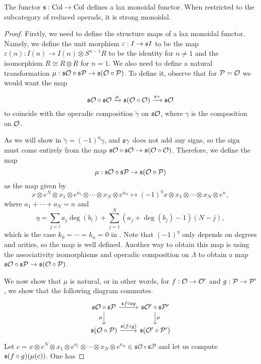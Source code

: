 \documentclass[Thesis.tex]{subfiles}
\begin{document}
\begin{propo}
The functor $\mathfrak{s}:\mathrm{Col}\to \mathrm{Col}$ defines a lax monoidal functor. When restricted to the subcategory of reduced operads, it is strong monoidal.
\end{propo}
\begin{proof}
Firstly, we need to define the structure maps of a lax monoidal functor. Namely, we define the unit morphism $\varepsilon:I\to\mathfrak{s} I$ to be the map $\varepsilon(n):I(n)\to I(n)\otimes S^{n-1}R$ to be the identity for $n\neq 1$ and the isomorphism $R\cong R\otimes R$ for $n=1$. We also need to define a natural transformation $\mu:\mathfrak{s}{\mathcal O}\circ\mathfrak{s}\mathcal{P}\to\mathfrak{s}({\mathcal O}\circ\mathcal{P})$. To define it, observe that for $\mathcal{P}={\mathcal O}$ we would want the map

\[\mathfrak{s}{\mathcal O}\circ\mathfrak{s}{\mathcal O}\xrightarrow{\mu}\mathfrak{s}({\mathcal O}\circ{\mathcal O})\xrightarrow{\mathfrak{s}\gamma}\mathfrak{s}{\mathcal O}\]
 to coincide with the operadic composition $\tilde{\gamma}$ on $\mathfrak{s}{\mathcal O}$, where $\gamma$ is the composition on ${\mathcal O}$. 
 
 As we will show in  $\tilde{\gamma}=(-1)^\eta\gamma$, and $\mathfrak{s}\gamma$ does not add any signs, so the sign must come entirely from the map $\mathfrak{s}{\mathcal O}\circ\mathfrak{s}{\mathcal O}\to\mathfrak{s}({\mathcal O}\circ{\mathcal O})$. Therefore, we define the map \[\mu:\mathfrak{s}{\mathcal O}\circ\mathfrak{s}\mathcal{P}\to\mathfrak{s}({\mathcal O}\circ\mathcal{P})\] as the map given by
 \[x\otimes e^N\otimes x_1\otimes e^{a_1}\otimes\cdots\otimes x_N\otimes e^{a_N}\mapsto (-1)^\eta x\otimes x_1\otimes\cdots\otimes x_N \otimes e^n,\]
 where $a_1+\cdots+a_N=n$ and 
 \[\eta=\sum_{j<l}a_j\deg(b_l)+\sum_{j=1}^N (a_j+\deg(b_j)-1)(N-j),\]
 which is the case $k_0=\cdots=k_n=0$ in . Note that $(-1)^\eta$ only depends on degrees and arities, so the map is well defined. Another way to obtain this map is using the associativity isomorphisms and operadic composition on $\Lambda$ to obtain a map $\mathfrak{s}{\mathcal O}\circ\mathfrak{s}\mathcal{P}\to\mathfrak{s}({\mathcal O}\circ\mathcal{P})$.
 
We now show that $\mu$ is natural, or in other words, for $f:{\mathcal O}\to{\mathcal O}'$ and $g:\mathcal{P}\to\mathcal{P}'$, we show that the following diagram commutes.
\[\begin{tikzcd}
\mathfrak{s}\mathcal{O}\circ\mathfrak{s}\mathcal{P} \arrow[r, "\mathfrak{s}f\circ\mathfrak{s}g"] \arrow[d, "\mu"'] & \mathfrak{s}\mathcal{O}'\circ\mathfrak{s}\mathcal{P}' \arrow[d, "\mu"] \\
\mathfrak{s}(\mathcal{O}\circ\mathcal{P}) \arrow[r, "\mathfrak{s}(f\circ g)"]                                      & \mathfrak{s}(\mathcal{O}'\circ\mathcal{P}')                           
\end{tikzcd}\]
 Let $c=x\otimes e^N\otimes x_1\otimes e^{a_1}\otimes\cdots\otimes x_N\otimes e^{a_N}\in \mathfrak{s}\mathcal{O}\circ\mathfrak{s}\mathcal{P}$ and let us compute $\mathfrak{s}(f\circ g)(\mu(c))$. One has
 

\end{proof}
\end{document}
